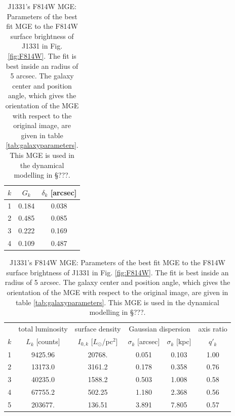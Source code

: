 \begin{table}
\centering
\begin{minipage}[t]{40mm}
\caption{F814W PSF MGE: Parameters of the circular four-Gaussian MGE in Eq. (\ref{eq:PSFgeneral} fitted to the radial profile of the synthetic HST/F814W PSF image by [TO DO].}
\begin{tabular}{ccc}
\hline
$k$ & $G_k$ & $\delta_k$ [arcsec] \\\hline
1 & 0.184 & 0.038\\
2 & 0.485 & 0.085\\
3 & 0.222 & 0.169\\
4 & 0.109 & 0.487\\\hline
\end{tabular}
\label{tab:PSFMGEF814W}
\end{minipage}
\hspace{10mm}
\begin{minipage}[t]{100mm}
\caption{J1331's F814W MGE: Parameters of the best fit MGE to the F814W surface brightness of J1331 in Fig. \ref{fig:F814W}. The fit is best inside an radius of 5 arcsec. The galaxy center and position angle, which gives the orientation of the MGE with respect to the original image, are given in table \ref{tab:galaxyparameters}. This MGE is used in the dynamical modelling in \S ???.}
\begin{tabular}{cccccc}
\hline
 & total luminosity  & surface density & \multicolumn{2}{c}{Gaussian dispersion} & axis ratio\\
$k$  & $L_k$ [counts] & $I_{0,k}$ [$L_\odot$/pc$^2$] & $\sigma_k$ [arcsec] & $\sigma_k$ [kpc] & $q'_k$\\\hline
1  &     9425.96 &      20768.  &  0.051   & 0.103  & 1.00\\
2  &    13173.0 &        3161.2 &  0.178   & 0.358  & 0.76\\
3  &    40235.0 &        1588.2 &  0.503   & 1.008  & 0.58\\
4  &    67755.2 &         502.25&  1.180   & 2.368  & 0.56\\
5  &    203677. &         136.51&  3.891   & 7.805  & 0.57\\\hline
\end{tabular}
\label{tab:MGEF814W}
\end{minipage}
\end{table}


